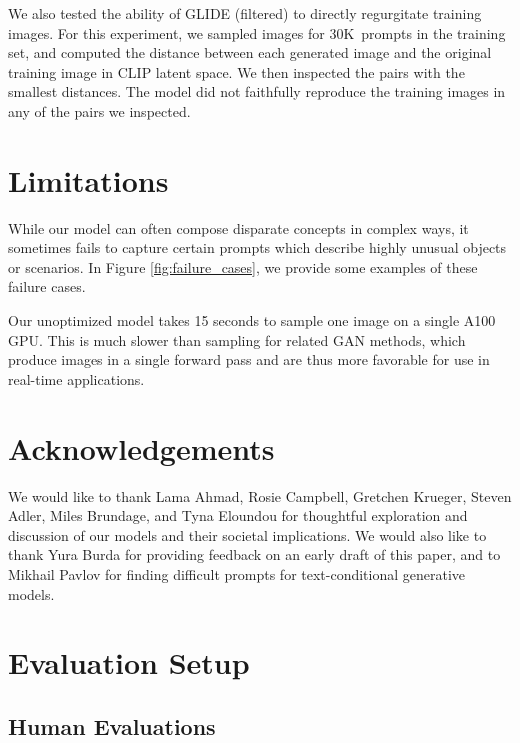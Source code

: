\documentclass{article}
\newcommand{\modelname}{GLIDE}
\begin{document}
We also tested the ability of \modelname{} (filtered) to directly regurgitate training images. For this experiment, we sampled images for 30K~prompts in the training set, and computed the distance between each generated image and the original training image in CLIP latent space. We then inspected the pairs with the smallest distances. The model did not faithfully reproduce the training images in any of the pairs we inspected.

\section{Limitations}
\label{sec:limitations}

While our model can often compose disparate concepts in complex ways, it sometimes fails to capture certain prompts which describe highly unusual objects or scenarios. In Figure \ref{fig:failure_cases}, we provide some examples of these failure cases.

Our unoptimized model takes 15 seconds to sample one image on a single A100 GPU. This is much slower than sampling for related GAN methods, which produce images in a single forward pass and are thus more favorable for use in real-time applications.

\section{Acknowledgements}
\label{sec:acknowledgements}

We would like to thank Lama Ahmad, Rosie Campbell, Gretchen Krueger, Steven Adler, Miles Brundage, and Tyna Eloundou for thoughtful exploration and discussion of our models and their societal implications. We would also like to thank Yura Burda for providing feedback on an early draft of this paper, and to Mikhail Pavlov for finding difficult prompts for text-conditional generative models.





\clearpage

\appendix

\section{Evaluation Setup}

\subsection{Human Evaluations}
\label{app:human_evals}
\end{document}

